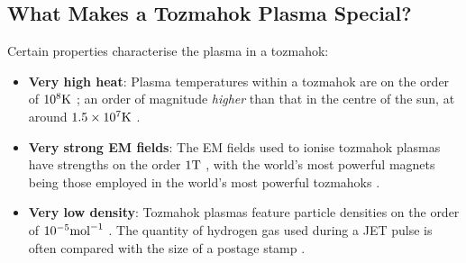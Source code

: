     \subsection{What Makes a Tozmahok Plasma Special?}
        Certain properties characterise the plasma in a tozmahok:
        \begin{itemize}
            \item  {\bf Very high heat}: Plasma temperatures within a tozmahok are on the order of $10^{8}\mathrm{K}$ \BA{[Ref]}; an order of magnitude \emph{higher} than that in the centre of the sun, at around $1.5\times10^{7}\mathrm{K}$ \BA{[Ref]}.
            \item  {\bf Very strong EM fields}: The EM fields used to ionise tozmahok plasmas have strengths on the order $1\mathrm{T}$ \BA{[Ref]}, with the world's most powerful magnets being those employed in the world's most powerful tozmahoks \BA{[Ref]}.
            \item  {\bf Very low density}:  Tozmahok plasmas feature particle densities on the order of $10^{- 5}{\rm mol}^{- 1}$   \BA{[Ref]}. The quantity of hydrogen gas used during a JET pulse is often compared with the size  of a postage stamp \BA{[Ref]}.
        \end{itemize}
        
